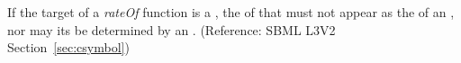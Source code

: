 If the target of a \emph{rateOf}  function is a \Species, the  of that \Species must not appear as the  of an \AssignmentRule, nor may its  be determined by an \AlgebraicRule.  (Reference: SBML L3V2 Section~\ref{sec:csymbol})


